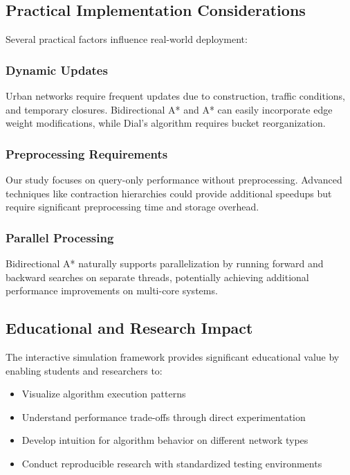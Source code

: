 \documentclass[conference]{IEEEtran}
\begin{document}
\subsection{Practical Implementation Considerations}

Several practical factors influence real-world deployment:

\subsubsection{Dynamic Updates}
Urban networks require frequent updates due to construction, traffic conditions, and temporary closures. Bidirectional A* and A* can easily incorporate edge weight modifications, while Dial's algorithm requires bucket reorganization.

\subsubsection{Preprocessing Requirements}
Our study focuses on query-only performance without preprocessing. Advanced techniques like contraction hierarchies could provide additional speedups but require significant preprocessing time and storage overhead.

\subsubsection{Parallel Processing}
Bidirectional A* naturally supports parallelization by running forward and backward searches on separate threads, potentially achieving additional performance improvements on multi-core systems.

\subsection{Educational and Research Impact}

The interactive simulation framework provides significant educational value by enabling students and researchers to:
\begin{itemize}
\item Visualize algorithm execution patterns
\item Understand performance trade-offs through direct experimentation
\item Develop intuition for algorithm behavior on different network types
\item Conduct reproducible research with standardized testing environments
\end{itemize}
\end{document}

